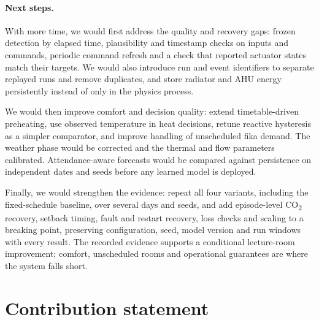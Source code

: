\documentclass[11pt,a4paper]{article}
\begin{document}
\paragraph{Next steps.}
With more time, we would first address the quality and recovery gaps: frozen detection by elapsed time, plausibility and timestamp checks on inputs and commands, periodic command refresh and a check that reported actuator states match their targets. We would also introduce run and event identifiers to separate replayed runs and remove duplicates, and store radiator and AHU energy persistently instead of only in the physics process.

We would then improve comfort and decision quality: extend timetable-driven preheating, use observed temperature in heat decisions, retune reactive hysteresis as a simpler comparator, and improve handling of unscheduled fika demand. The weather phase would be corrected and the thermal and flow parameters calibrated. Attendance-aware forecasts would be compared against persistence on independent dates and seeds before any learned model is deployed.

Finally, we would strengthen the evidence: repeat all four variants, including the fixed-schedule baseline, over several days and seeds, and add episode-level CO\textsubscript{2} recovery, setback timing, fault and restart recovery, loss checks and scaling to a breaking point, preserving configuration, seed, model version and run windows with every result. The recorded evidence supports a conditional lecture-room improvement; comfort, unscheduled rooms and operational guarantees are where the system falls short.

\section*{Contribution statement}
\end{document}
